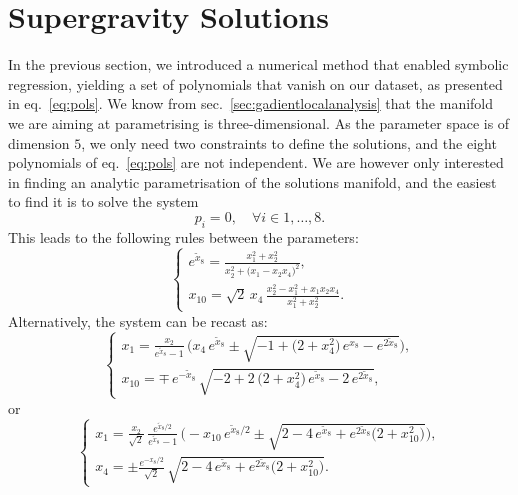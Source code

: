 \documentclass[11pt,a4paper]{article}
\begin{document}
\section{Supergravity Solutions}
In the previous section, we introduced a numerical method that enabled symbolic regression, yielding a set of polynomials that vanish on our dataset, as presented in eq.~\eqref{eq:pols}. We know from sec.~\ref{sec:gadientlocalanalysis} that the manifold we are aiming at parametrising is three-dimensional. As the parameter space is of dimension $5$, we only need two constraints to define the solutions, and the eight polynomials of eq.~\eqref{eq:pols} are not independent. We are however only interested in finding an analytic parametrisation of the solutions manifold, and the easiest to find it is to solve the system
	\begin{equation}\label{eq:solvepol}
		p_i = 0, \quad \forall i \in {1,\dots,8}.
	\end{equation}
	This leads to the following rules between the parameters:
	\begin{equation}\label{eq:rulex8x10}
		\begin{cases}
			\displaystyle e^{\tilde{x}_{8}} = \frac{x_{1}^{2}+x_{2}^{2}}{x_{2}^{2} + \big(x_{1}-x_{2}x_{4}\big)^{2}},\\[10pt]
			\displaystyle x_{10} = \sqrt{2}\,x_{4}\,\frac{x_{2}^{2} - x_{1}^{2}+x_{1}x_{2}x_{4}}{x_{1}^{2}+x_{2}^{2}}.
		\end{cases}
	\end{equation}
	Alternatively, the system can be recast as:
	\begin{equation}
		\begin{cases}
			\displaystyle x_{1} = \frac{x_{2}}{e^{\tilde{x}_{8}}-1}\,\Big(x_{4}\,e^{\tilde{x}_{8}} \pm \sqrt{-1+\big(2+x_{4}^{2}\big)\,e^{x_{8}}-e^{2\tilde{x}_{8}}}\Big),\\[8pt]
			\displaystyle x_{10} = \mp\,e^{-\tilde{x}_{8}}\,\sqrt{-2+2\,\big(2+x_{4}^{2}\big)\,e^{\tilde{x}_{8}}-2\,e^{2\tilde{x}_{8}}},
		\end{cases}
	\end{equation}
	or
	\begin{equation}
		\begin{cases}
			\displaystyle x_{1} = \frac{x_{2}}{\sqrt{2}}\,\frac{e^{\tilde{x}_{8}/2}}{e^{\tilde{x}_{8}}-1}\,\Big(-x_{10}\,e^{\tilde{x}_{8}/2} \pm \sqrt{2-4\,e^{\tilde{x}_{8}}+e^{2\tilde{x}_{8}}\big(2+x_{10}^{2}\big)}\Big),\\[8pt]
			\displaystyle x_{4} = \pm \frac{e^{-x_{8}/2}}{\sqrt{2}}\,\sqrt{2-4\,e^{\tilde{x}_{8}}+e^{2\tilde{x}_{8}}\big(2+x_{10}^{2}\big)}.
		\end{cases}
	\end{equation}
\end{document}

